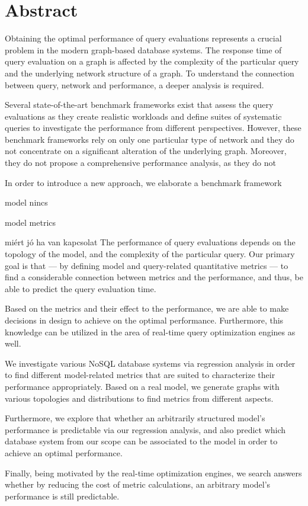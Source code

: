\vfill
{}
\englishParagraph


\chapter*{Abstract}
Obtaining the optimal performance of query evaluations represents a crucial problem in the modern graph-based database systems. The response time of query evaluation on a graph is affected by the complexity of the particular query and the underlying network structure of a graph. To understand the connection between query, network and performance, a deeper analysis is required.

Several state-of-the-art benchmark frameworks exist that assess the query evaluations as they create realistic workloads and define suites of systematic queries to investigate the performance from different perspectives. However, these benchmark frameworks rely on only one particular type of network and they do not concentrate on a significant alteration of the underlying graph. Moreover, they do not propose a comprehensive performance analysis, as they do not 

In order to introduce a new approach, we elaborate a benchmark framework

model nincs

model metrics

miért jó ha van kapcsolat
The performance of query evaluations depends on the topology of the model, and the complexity of the particular query. Our primary goal is that --- by defining model and query-related quantitative metrics ---  to find a considerable connection between metrics and the performance, and thus, be able to predict the query evaluation time.

Based on the metrics and their effect to the performance, we are able to make decisions in design to achieve on the optimal performance. Furthermore, this knowledge can be utilized in the area of real-time query optimization engines as well.

We investigate various NoSQL database systems via regression analysis in order to find different model-related metrics that are suited to characterize their performance appropriately. Based on a real model, we generate graphs with various topologies and distributions to find metrics from different aspects.

Furthermore, we explore that whether an arbitrarily structured model's performance is predictable via our regression analysis, and also predict which database system from our scope can be associated to the model in order to achieve an optimal performance.

Finally, being motivated by the real-time optimization engines, we search answers whether by reducing the cost of metric calculations, an arbitrary model's performance is still predictable.


\vfill
\dolgozatnyelve
{}

\setcounter{romanPage}{\value{page}}

